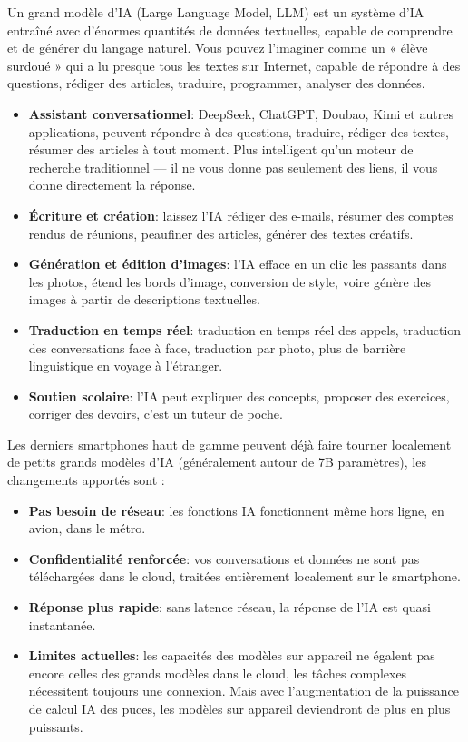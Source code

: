 
Un grand modèle d'IA (Large Language Model, LLM) est un système d'IA entraîné avec d'énormes quantités de données textuelles, capable de comprendre et de générer du langage naturel. Vous pouvez l'imaginer comme un « élève surdoué » qui a lu presque tous les textes sur Internet, capable de répondre à des questions, rédiger des articles, traduire, programmer, analyser des données.


\begin{itemize}
  \item \textbf{Assistant conversationnel}: DeepSeek, ChatGPT, Doubao, Kimi et autres applications, peuvent répondre à des questions, traduire, rédiger des textes, résumer des articles à tout moment. Plus intelligent qu'un moteur de recherche traditionnel — il ne vous donne pas seulement des liens, il vous donne directement la réponse.
  \item \textbf{Écriture et création}: laissez l'IA rédiger des e-mails, résumer des comptes rendus de réunions, peaufiner des articles, générer des textes créatifs.
  \item \textbf{Génération et édition d'images}: l'IA efface en un clic les passants dans les photos, étend les bords d'image, conversion de style, voire génère des images à partir de descriptions textuelles.
  \item \textbf{Traduction en temps réel}: traduction en temps réel des appels, traduction des conversations face à face, traduction par photo, plus de barrière linguistique en voyage à l'étranger.
  \item \textbf{Soutien scolaire}: l'IA peut expliquer des concepts, proposer des exercices, corriger des devoirs, c'est un tuteur de poche.
\end{itemize}


Les derniers smartphones haut de gamme peuvent déjà faire tourner localement de petits grands modèles d'IA (généralement autour de 7B paramètres), les changements apportés sont :

\begin{itemize}
  \item \textbf{Pas besoin de réseau}: les fonctions IA fonctionnent même hors ligne, en avion, dans le métro.
  \item \textbf{Confidentialité renforcée}: vos conversations et données ne sont pas téléchargées dans le cloud, traitées entièrement localement sur le smartphone.
  \item \textbf{Réponse plus rapide}: sans latence réseau, la réponse de l'IA est quasi instantanée.
  \item \textbf{Limites actuelles}: les capacités des modèles sur appareil ne égalent pas encore celles des grands modèles dans le cloud, les tâches complexes nécessitent toujours une connexion. Mais avec l'augmentation de la puissance de calcul IA des puces, les modèles sur appareil deviendront de plus en plus puissants.
\end{itemize}

